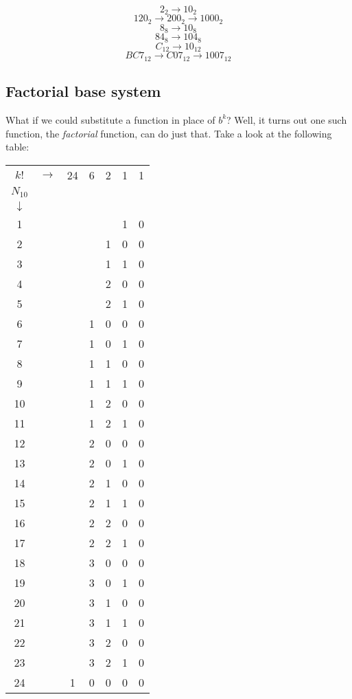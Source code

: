 \documentclass{article}
\begin{document}
$$2_2 \rightarrow 10_2$$
$$120_2 \rightarrow 200_2 \rightarrow 1000_2$$
$$8_8 \rightarrow 10_8$$
$$84_8 \rightarrow 104_8$$
$$C_{12} \rightarrow 10_{12}$$
$$BC7_{12} \rightarrow C07_{12} \rightarrow 1007_{12}$$

\subsection{Factorial base system}

\noindent What if we could substitute a function in place of $b^k$? Well, it turns out one such function, the \textit{factorial} function, can do just that. Take a look at the following table:

\begin{center}
\begin{tabular}{c c c c c c c}
$k!$ & $\rightarrow$ & 24 & 6 & 2 & 1 & 1\\
$N_{10}$\\
$\downarrow$\\
1 & & & & & 1 & 0\\
2 & & & & 1 & 0 & 0\\
3 & & & & 1 & 1 & 0\\
4 & & & & 2 & 0 & 0\\
5 & & & & 2 & 1 & 0\\
6 & & & 1 & 0 & 0 & 0\\
7 & & & 1 & 0 & 1 & 0\\
8 & & & 1 & 1 & 0 & 0\\
9 & & & 1 & 1 & 1 & 0\\
10& & & 1 & 2 & 0 & 0\\
11& & & 1 & 2 & 1 & 0\\
12& & & 2 & 0 & 0 & 0\\
13& & & 2 & 0 & 1 & 0\\
14& & & 2 & 1 & 0 & 0\\
15& & & 2 & 1 & 1 & 0\\
16& & & 2 & 2 & 0 & 0\\
17& & & 2 & 2 & 1 & 0\\
18& & & 3 & 0 & 0 & 0\\
19& & & 3 & 0 & 1 & 0\\
20& & & 3 & 1 & 0 & 0\\
21& & & 3 & 1 & 1 & 0\\
22& & & 3 & 2 & 0 & 0\\
23& & & 3 & 2 & 1 & 0\\
24& & 1 & 0 & 0 & 0 & 0\\
\end{tabular}
\end{center}
\end{document}
